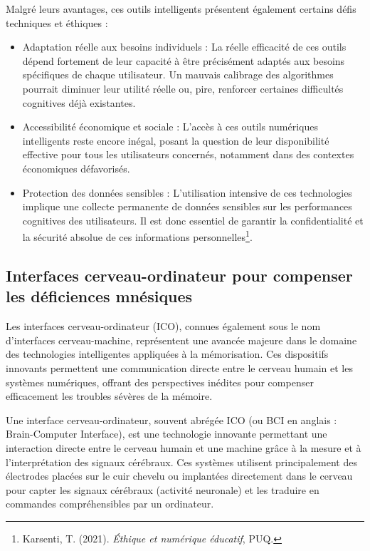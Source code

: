 \documentclass[11pt,a4paper]{report}
\begin{document}
Malgré leurs avantages, ces outils intelligents présentent également certains défis techniques et éthiques :

\begin{itemize}

    \item Adaptation réelle aux besoins individuels :
La réelle efficacité de ces outils dépend fortement de leur capacité à être précisément adaptés aux besoins spécifiques de chaque utilisateur. Un mauvais calibrage des algorithmes pourrait diminuer leur utilité réelle ou, pire, renforcer certaines difficultés cognitives déjà existantes.

    \item Accessibilité économique et sociale :
L’accès à ces outils numériques intelligents reste encore inégal, posant la question de leur disponibilité effective pour tous les utilisateurs concernés, notamment dans des contextes économiques défavorisés.

    \item Protection des données sensibles :
L’utilisation intensive de ces technologies implique une collecte permanente de données sensibles sur les performances cognitives des utilisateurs. Il est donc essentiel de garantir la confidentialité et la sécurité absolue de ces informations personnelles\footnote{Karsenti, T. (2021). \textit{Éthique et numérique éducatif}, PUQ.}.

\end{itemize}

\subsection{Interfaces cerveau-ordinateur pour compenser les déficiences mnésiques}

Les interfaces cerveau-ordinateur (ICO), connues également sous le nom d’interfaces cerveau-machine, représentent une avancée majeure dans le domaine des technologies intelligentes appliquées à la mémorisation. Ces dispositifs innovants permettent une communication directe entre le cerveau humain et les systèmes numériques, offrant des perspectives inédites pour compenser efficacement les troubles sévères de la mémoire.

Une interface cerveau-ordinateur, souvent abrégée ICO (ou BCI en anglais : Brain-Computer Interface), est une technologie innovante permettant une interaction directe entre le cerveau humain et une machine grâce à la mesure et à l’interprétation des signaux cérébraux. Ces systèmes utilisent principalement des électrodes placées sur le cuir chevelu ou implantées directement dans le cerveau pour capter les signaux cérébraux (activité neuronale) et les traduire en commandes compréhensibles par un ordinateur.
\end{document}
